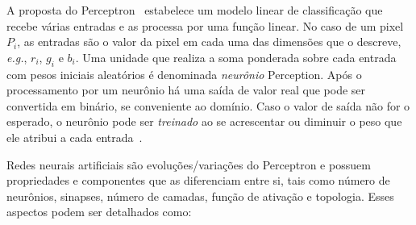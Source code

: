 A proposta do Perceptron~\cite{Mcculloch1943} estabelece um modelo linear de classificação que recebe várias entradas e as processa por uma função linear.
No caso de um pixel $P_i$, as entradas são o valor da pixel em cada uma das dimensões que o descreve, \textit{e.g.}, $r_i$, $g_i$ e $b_i$.
Uma unidade que realiza a soma ponderada sobre cada entrada com pesos iniciais aleatórios é denominada \textit{neurônio} Perception.
Após o processamento por um neurônio há uma saída de valor real que pode ser convertida em binário, se conveniente ao domínio.
Caso o valor de saída não for o esperado, o neurônio pode ser \textit{treinado} ao se acrescentar ou diminuir o peso que ele atribui a cada entrada~\cite{Mcculloch1943,Rosenblatt1958}.

Redes neurais artificiais são evoluções/variações do Perceptron e possuem propriedades e componentes que as diferenciam entre si, tais como número de neurônios, sinapses, número de camadas, função de ativação e topologia. 
Esses aspectos podem ser detalhados como:

